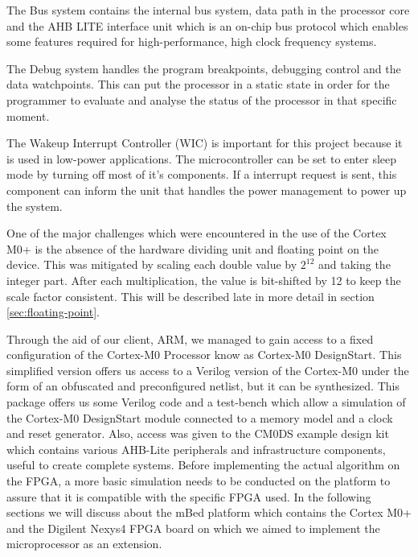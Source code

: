 The Bus system contains the internal bus system, data path in the processor core and the AHB LITE interface unit which is an on-chip bus protocol which enables some features required for high-performance, high clock frequency systems. 

The Debug system handles the program breakpoints, debugging control and the data watchpoints. This can put the processor in a  static state in order for the programmer to evaluate and analyse the status of the processor in that specific moment.

The Wakeup Interrupt Controller (WIC) is important for this project because it is used in low-power applications. The microcontroller can be set to enter sleep mode by turning off most of it's components. If a interrupt request is sent, this component can inform the unit that handles the power management to power up the system.

One of the major challenges which were encountered in the use of the Cortex M0+ is the absence of the hardware dividing unit and floating point  on the device. This was mitigated by scaling each double value by $2^{12}$ and taking the integer part. After each multiplication, the value is bit-shifted by 12 to keep the scale factor consistent. This will be described late in more detail in section \ref{sec:floating-point}.

Through the aid of our client, ARM, we managed to gain access to a fixed configuration of the Cortex-M0 Processor know as Cortex-M0 DesignStart. This simplified version offers us access to a Verilog version of the Cortex-M0 under the form of an obfuscated and preconfigured netlist, but it can be synthesized. This package offers us some Verilog code and a test-bench which allow a simulation of the Cortex-M0 DesignStart module connected to a memory model and a clock and reset generator. Also, access was given to the CM0DS example design kit which contains various AHB-Lite peripherals and infrastructure components, useful to create complete systems. Before implementing the actual algorithm on the FPGA, a more basic simulation needs to be conducted on the platform to assure that it is compatible with the specific FPGA used. In the following sections we will discuss about the mBed platform which contains the Cortex M0+ and the Digilent Nexys4 FPGA board on which we aimed to implement the microprocessor as an extension.
